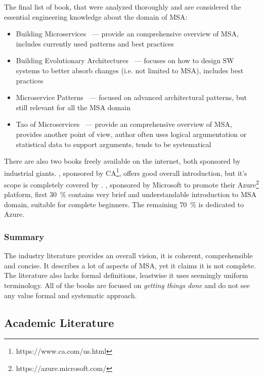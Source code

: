 \documentclass[thesis=M,english,hidelinks]{FITthesis}[2012/10/20]
\begin{document}
The final list of book, that were analyzed thoroughly and are considered the essential engineering knowledge about the domain of \acrshort{MSA}:
\begin{itemize}
    \item Building Microservices~\cite{ms-building-ms} --- provide an comprehensive overview of \acrshort{MSA}, includes currently used patterns and best practices
    \item Building Evolutionary Architectures~\cite{ms-evolutionary-arch} --- focuses on how to design \acrshort{SW} systems to better absorb changes (i.e. not limited to \acrshort{MSA}), includes best practices
    \item Microservice Patterns~\cite{ms-patterns} --- focused on advanced architectural patterns, but still relevant for all the \acrshort{MSA} domain  
    \item Tao of Microservices~\cite{ms-tao} --- provide an comprehensive overview of \acrshort{MSA}, provides another point of view, author often uses logical argumentation or statistical data to support arguments, tends to be systematical
\end{itemize}

There are also two books freely available on the internet, both sponsored by industrial giants. \cite{ms-ca}, sponsored by CA\footnote{https://www.ca.com/us.html}, offers good overall introduction, but it's scope is completely covered by \cite{ms-building-ms}. \cite{ms-bk-familiar}, sponsored by Microsoft to promote their Azure\footnote{https://azure.microsoft.com/} platform, first 30~\% contains very brief and understandable introduction to \acrshort{MSA} domain, suitable for complete beginners. The remaining 70~\% is dedicated to Azure.

\subsubsection*{Summary}
The industry literature provides an overall vision, it is coherent, comprehensible and concise. It describes a lot of aspects of \acrshort{MSA}, yet it claims it is not complete. The literature also lacks formal definitions, leastwise it uses seemingly uniform terminology. All of the books are focused on \textit{getting things done} and do not see any value formal and systematic approach.

\subsection{Academic Literature}
\label{sec:acad_literature}
\end{document}
